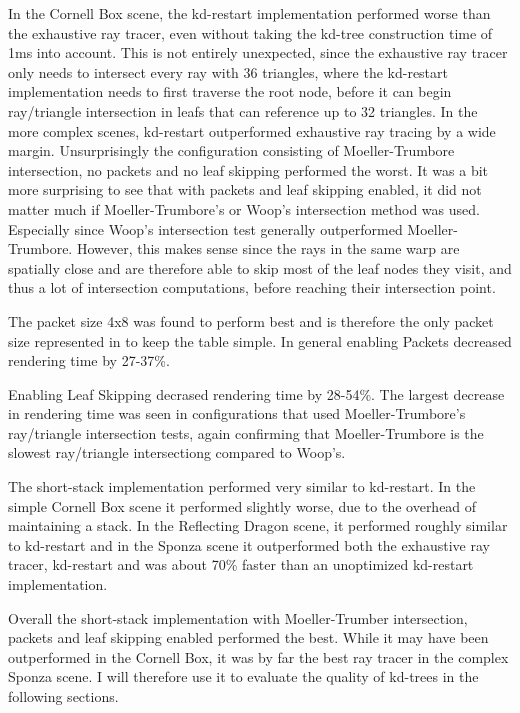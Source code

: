 In the Cornell Box scene, the kd-restart implementation performed worse than the
exhaustive ray tracer, even without taking the kd-tree construction time of 1ms
into account. This is not entirely unexpected, since the exhaustive ray tracer
only needs to intersect every ray with 36 triangles, where the kd-restart
implementation needs to first traverse the root node, before it can begin
ray/triangle intersection in leafs that can reference up to 32 triangles. In the
more complex scenes, kd-restart outperformed exhaustive ray tracing by a wide
margin. Unsurprisingly the configuration consisting of Moeller-Trumbore
intersection, no packets and no leaf skipping performed the worst. It was a bit
more surprising to see that with packets and leaf skipping enabled, it did not
matter much if Moeller-Trumbore's or Woop's intersection method was
used. Especially since Woop's intersection test generally outperformed
Moeller-Trumbore. However, this makes sense since the rays in the same warp are
spatially close and are therefore able to skip most of the leaf nodes they
visit, and thus a lot of intersection computations, before reaching their
intersection point.

The packet size 4x8 was found to perform best and is therefore the only packet
size represented in  to keep the table
simple. In general enabling Packets decreased rendering time by 27-37\%.

Enabling Leaf Skipping decrased rendering time by 28-54\%. The largest decrease
in rendering time was seen in configurations that used Moeller-Trumbore's
ray/triangle intersection tests, again confirming that Moeller-Trumbore is the
slowest ray/triangle intersectiong compared to Woop's.

The short-stack implementation performed very similar to kd-restart. In the
simple Cornell Box scene it performed slightly worse, due to the overhead of
maintaining a stack. In the Reflecting Dragon scene, it performed roughly
similar to kd-restart and in the Sponza scene it outperformed both the
exhaustive ray tracer, kd-restart and was about 70\% faster than an unoptimized
kd-restart implementation.

Overall the short-stack implementation with Moeller-Trumber intersection,
packets and leaf skipping enabled performed the best. While it may have been
outperformed in the Cornell Box, it was by far the best ray tracer in the
complex Sponza scene. I will therefore use it to evaluate the quality of
kd-trees in the following sections.


